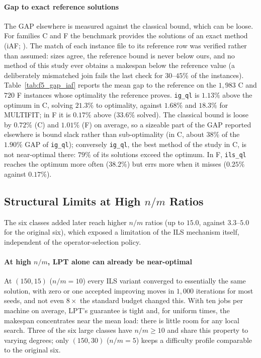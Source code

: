 \documentclass[final,3p,times,11pt,authoryear]{elsarticle}
\begin{document}




\paragraph{Gap to exact reference solutions}
The GAP elsewhere is measured against the classical bound, which can be
loose. For families C and F the benchmark provides the solutions of an exact
method (iAF; \citealp{OstojicEtAl2025}). The match of each instance file to
its reference row was verified rather than assumed: sizes agree, the
reference bound is never below ours, and no method of this study ever
obtains a makespan below the reference value (a deliberately mismatched
join fails the last check for $30$--$45\%$ of the instances).
Table~\ref{tab:f5_gap_iaf} reports the mean gap to the reference on the
$1{,}983$ C and $720$ F instances whose optimality the reference proves.
\texttt{ig\_ql} is $1.13\%$ above the optimum in C, solving $21.3\%$ to
optimality, against $1.68\%$ and $18.3\%$ for MULTIFIT; in F it is $0.17\%$
above ($33.6\%$ solved). The classical bound is loose by $0.72\%$ (C) and
$1.01\%$ (F) on average, so a sizeable part of the GAP reported elsewhere is
bound slack rather than sub-optimality (in C, about $38\%$ of the $1.90\%$
GAP of \texttt{ig\_ql}); conversely \texttt{ig\_ql}, the best method of the
study in C, is not near-optimal there: $79\%$ of its solutions exceed the
optimum. In F, \texttt{ils\_ql} reaches the optimum more often ($38.2\%$)
but errs more when it misses ($0.25\%$ against $0.17\%$).



\subsection{Structural Limits at High $n/m$ Ratios}
\label{sec:nm-structural}

The six classes added later reach higher $n/m$ ratios (up to $15.0$,
against $3.3$--$5.0$ for the original six), which exposed a limitation of
the ILS mechanism itself, independent of the operator-selection policy.

\paragraph{At high $n/m$, LPT alone can already be near-optimal}
At $(150,15)$ ($n/m=10$) every ILS variant converged to essentially the
same solution, with zero or one accepted improving moves in $1{,}000$
iterations for most seeds, and not even $8\times$ the standard budget
changed this. With ten jobs per machine on average, LPT's guarantee is
tight and, for uniform times, the makespan concentrates near the mean
load: there is little room for any local search. Three of the six large
classes have $n/m \geq 10$ and share this property to varying degrees;
only $(150,30)$ ($n/m=5$) keeps a difficulty profile comparable to the
original six.
\end{document}
